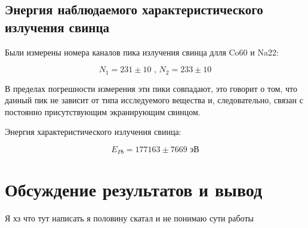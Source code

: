 	\newpage

	\subsection{Энергия наблюдаемого характеристического излучения свинца}
	
	Были измерены номера каналов пика излучения свинца длля Co60 и Na22: 
	
	\[ N_{1} = 231 \pm 10\text{ , } N_{2} = 233 \pm 10\]
	
	В пределах погрешности измерения эти пики совпадают, это говорит о том, что данный пик не зависит от типа исследуемого вещества и, следовательно, связан с постоянно присутствующим экранирующим свинцом.
	
	Энергия характеристического излучения свинца:
	
	\[E_{Pb} = 177163 \pm 7669 \text{ эВ} \]
	
	\newpage

	
	
	

\newpage
	
	
	
	

	\section{Обсуждение результатов и вывод}
	
	Я хз что тут написать я половину скатал и не понимаю сути работы


